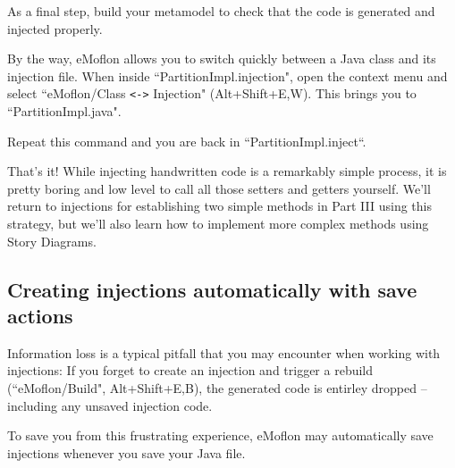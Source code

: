 \begin{stepbystep}
\clearpage

\item As a final step, build your metamodel to check that the code is generated and injected properly.

\item By the way, eMoflon allows you to switch quickly between a Java class and its injection file.
When inside ``PartitionImpl.injection", open the context menu and select ``eMoflon/Class \verb|<->| Injection" (Alt+Shift+E,W).
This brings you to ``PartitionImpl.java".

Repeat this command and you are back in ``PartitionImpl.inject``.


\item That's it! While injecting handwritten code is a remarkably simple process, it is pretty boring and low level to call all those
setters and getters yourself. We'll return to injections for establishing two simple methods in Part III using this strategy, but we'll also learn how to
implement more complex methods using Story Diagrams.
 
\end{stepbystep}

\subsection*{Creating injections automatically with save actions}

Information loss is a typical pitfall that you may encounter when working with injections:
If you forget to create an injection and trigger a rebuild (``eMoflon/Build", Alt+Shift+E,B), the generated code is entirley dropped -- including any unsaved injection code.

To save you from this frustrating experience, eMoflon may automatically save injections whenever you save your Java file.

